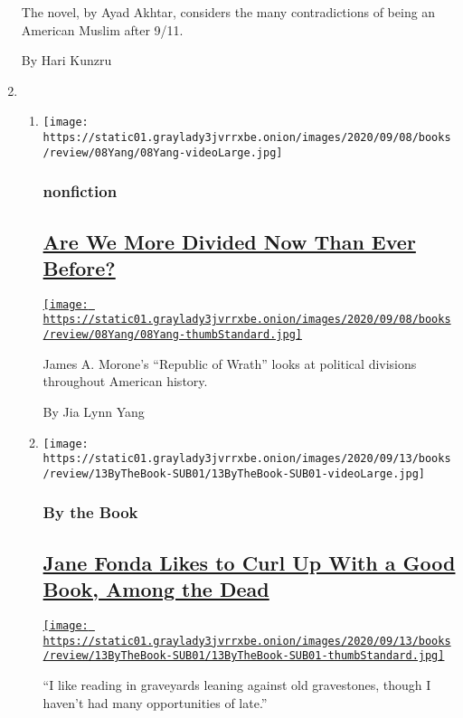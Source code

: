 \begin{enumerate}
  The novel, by Ayad Akhtar, considers the many contradictions of being
  an American Muslim after 9/11.

  By Hari Kunzru
\item
  \begin{enumerate}
  \def\labelenumii{\arabic{enumii}.}
  \item
    \texttt{[image: https://static01.graylady3jvrrxbe.onion/images/2020/09/08/books/review/08Yang/08Yang-videoLarge.jpg]}

    \hypertarget{nonfiction-1}{%
    \subsubsection{nonfiction}\label{nonfiction-1}}

    \hypertarget{are-we-more-divided-now-than-ever-before}{%
    \subsection{\texorpdfstring{\href{/2020/09/08/books/review/republic-of-wrath-james-a-morone.html}{Are
    We More Divided Now Than Ever
    Before?}}{Are We More Divided Now Than Ever Before?}}\label{are-we-more-divided-now-than-ever-before}}

    \href{/2020/09/08/books/review/republic-of-wrath-james-a-morone.html}{\texttt{[image: https://static01.graylady3jvrrxbe.onion/images/2020/09/08/books/review/08Yang/08Yang-thumbStandard.jpg]}}

    James A. Morone's ``Republic of Wrath'' looks at political divisions
    throughout American history.

    By Jia Lynn Yang
  \item
    \texttt{[image: https://static01.graylady3jvrrxbe.onion/images/2020/09/13/books/review/13ByTheBook-SUB01/13ByTheBook-SUB01-videoLarge.jpg]}

    \hypertarget{by-the-book}{%
    \subsubsection{By the Book}\label{by-the-book}}

    \hypertarget{jane-fonda-likes-to-curl-up-with-a-good-book-among-the-dead}{%
    \subsection{\texorpdfstring{\href{/2020/09/10/books/review/jane-fonda-by-the-book-interview.html}{Jane
    Fonda Likes to Curl Up With a Good Book, Among the
    Dead}}{Jane Fonda Likes to Curl Up With a Good Book, Among the Dead}}\label{jane-fonda-likes-to-curl-up-with-a-good-book-among-the-dead}}

    \href{/2020/09/10/books/review/jane-fonda-by-the-book-interview.html}{\texttt{[image: https://static01.graylady3jvrrxbe.onion/images/2020/09/13/books/review/13ByTheBook-SUB01/13ByTheBook-SUB01-thumbStandard.jpg]}}

    ``I like reading in graveyards leaning against old gravestones,
    though I haven't had many opportunities of late.''
  \end{enumerate}
\end{enumerate}

